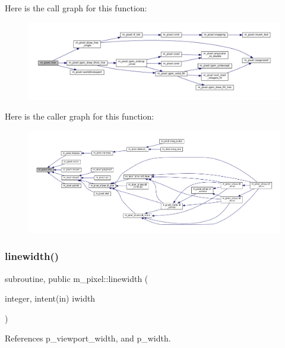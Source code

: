 Here is the call graph for this function\+:
\nopagebreak
\begin{figure}[H]
\begin{center}
\leavevmode
\includegraphics[width=350pt]{namespacem__pixel_a491951b89e60d0d40d67f22d987da894_cgraph}
\end{center}
\end{figure}
Here is the caller graph for this function\+:
\nopagebreak
\begin{figure}[H]
\begin{center}
\leavevmode
\includegraphics[width=350pt]{namespacem__pixel_a491951b89e60d0d40d67f22d987da894_icgraph}
\end{center}
\end{figure}
\mbox{\label{namespacem__pixel_a16379e283aaa99e2e0ba1eb26e93452d}} 
\subsubsection{\texorpdfstring{linewidth()}{linewidth()}}
{\footnotesize\ttfamily subroutine, public m\+\_\+pixel\+::linewidth (\begin{DoxyParamCaption}\item[{integer, intent(in)}]{iwidth }\end{DoxyParamCaption})}



References p\+\_\+viewport\+\_\+width, and p\+\_\+width.

